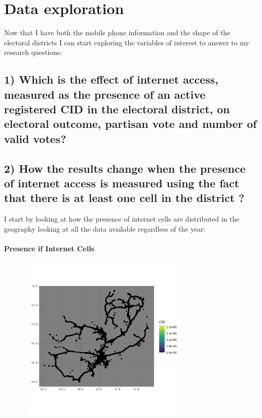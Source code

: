 \documentclass[
]{article}
\begin{document}
\hypertarget{data-exploration}{%
\section{Data exploration}\label{data-exploration}}

Now that I have both the mobile phone information and the shape of the
electoral districts I can start exploring the variables of interest to
answer to my research questions:

\hypertarget{which-is-the-effect-of-internet-access-measured-as-the-presence-of-an-active-registered-cid-in-the-electoral-district-on-electoral-outcome-partisan-vote-and-number-of-valid-votes}{%
\subsection{1) Which is the effect of internet access, measured as the
presence of an active registered CID in the electoral district, on
electoral outcome, partisan vote and number of valid
votes?}\label{which-is-the-effect-of-internet-access-measured-as-the-presence-of-an-active-registered-cid-in-the-electoral-district-on-electoral-outcome-partisan-vote-and-number-of-valid-votes}}

\hypertarget{how-the-results-change-when-the-presence-of-internet-access-is-measured-using-the-fact-that-there-is-at-least-one-cell-in-the-district}{%
\subsection{2) How the results change when the presence of internet
access is measured using the fact that there is at least one cell in the
district
?}\label{how-the-results-change-when-the-presence-of-internet-access-is-measured-using-the-fact-that-there-is-at-least-one-cell-in-the-district}}

I start by looking at how the presence of internet cells are distributed
in the geography looking at all the data available regardless of the
year:

\hypertarget{presence-if-internet-cells}{%
\paragraph{Presence if Internet
Cells}\label{presence-if-internet-cells}}

\includegraphics[width=4.16667in,height=3.125in]{presence_cells.png}
\end{document}
